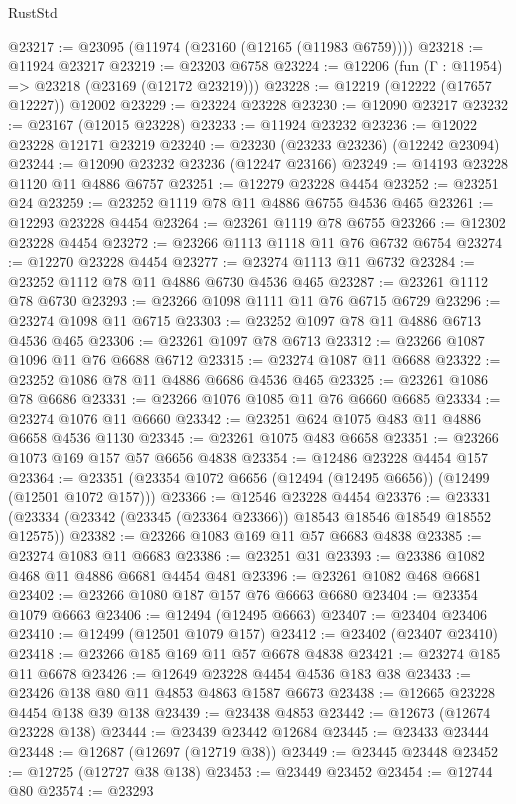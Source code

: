 \begin{lexlean}{RustStd}
\begin{coremodule}
@23217 := @23095 (@11974 (@23160 (@12165 (@11983 @6759))))
@23218 := @11924 @23217
@23219 := @23203 @6758
@23224 := @12206 (fun (Γ : @11954) => @23218 (@23169 (@12172 @23219)))
@23228 := @12219 (@12222 (@17657 @12227)) @12002
@23229 := @23224 @23228
@23230 := @12090 @23217
@23232 := @23167 (@12015 @23228)
@23233 := @11924 @23232
@23236 := @12022 @23228 @12171 @23219
@23240 := @23230 (@23233 @23236) (@12242 @23094)
@23244 := @12090 @23232 @23236 (@12247 @23166)
@23249 := @14193 @23228 @1120 @11 @4886 @6757
@23251 := @12279 @23228 @4454
@23252 := @23251 @24
@23259 := @23252 @1119 @78 @11 @4886 @6755 @4536 @465
@23261 := @12293 @23228 @4454
@23264 := @23261 @1119 @78 @6755
@23266 := @12302 @23228 @4454
@23272 := @23266 @1113 @1118 @11 @76 @6732 @6754
@23274 := @12270 @23228 @4454
@23277 := @23274 @1113 @11 @6732
@23284 := @23252 @1112 @78 @11 @4886 @6730 @4536 @465
@23287 := @23261 @1112 @78 @6730
@23293 := @23266 @1098 @1111 @11 @76 @6715 @6729
@23296 := @23274 @1098 @11 @6715
@23303 := @23252 @1097 @78 @11 @4886 @6713 @4536 @465
@23306 := @23261 @1097 @78 @6713
@23312 := @23266 @1087 @1096 @11 @76 @6688 @6712
@23315 := @23274 @1087 @11 @6688
@23322 := @23252 @1086 @78 @11 @4886 @6686 @4536 @465
@23325 := @23261 @1086 @78 @6686
@23331 := @23266 @1076 @1085 @11 @76 @6660 @6685
@23334 := @23274 @1076 @11 @6660
@23342 := @23251 @624 @1075 @483 @11 @4886 @6658 @4536 @1130
@23345 := @23261 @1075 @483 @6658
@23351 := @23266 @1073 @169 @157 @57 @6656 @4838
@23354 := @12486 @23228 @4454 @157
@23364 := @23351 (@23354 @1072 @6656 (@12494 (@12495 @6656)) (@12499 (@12501 @1072 @157)))
@23366 := @12546 @23228 @4454
@23376 := @23331 (@23334 (@23342 (@23345 (@23364 @23366)) @18543 @18546 @18549 @18552 @12575))
@23382 := @23266 @1083 @169 @11 @57 @6683 @4838
@23385 := @23274 @1083 @11 @6683
@23386 := @23251 @31
@23393 := @23386 @1082 @468 @11 @4886 @6681 @4454 @481
@23396 := @23261 @1082 @468 @6681
@23402 := @23266 @1080 @187 @157 @76 @6663 @6680
@23404 := @23354 @1079 @6663
@23406 := @12494 (@12495 @6663)
@23407 := @23404 @23406
@23410 := @12499 (@12501 @1079 @157)
@23412 := @23402 (@23407 @23410)
@23418 := @23266 @185 @169 @11 @57 @6678 @4838
@23421 := @23274 @185 @11 @6678
@23426 := @12649 @23228 @4454 @4536 @183 @38
@23433 := @23426 @138 @80 @11 @4853 @4863 @1587 @6673
@23438 := @12665 @23228 @4454 @138 @39 @138
@23439 := @23438 @4853
@23442 := @12673 (@12674 @23228 @138)
@23444 := @23439 @23442 @12684
@23445 := @23433 @23444
@23448 := @12687 (@12697 (@12719 @38))
@23449 := @23445 @23448
@23452 := @12725 (@12727 @38 @138)
@23453 := @23449 @23452
@23454 := @12744 @80
@23574 := @23293

\end{coremodule}
\end{lexlean}
